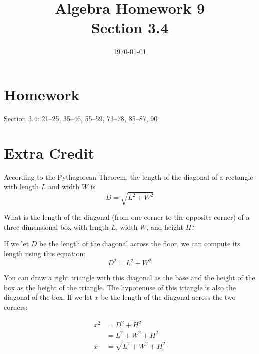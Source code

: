 \documentclass[letterpaper, landscape]{exam}
\title{Algebra Homework 9 \\ Section 3.4 }
\author{}
\date{\today}
\begin{document}
  \maketitle

  \section{Homework}

  Section 3.4: 21--25, 35--46, 55--59, 73--78, 85--87, 90 






  \section{Extra Credit}
  According to the Pythagorean Theorem, the length of the diagonal of a rectangle
  with length $L$ and width $W$ is 
  \[
    D = \sqrt{L^2 + W^2}
  \]  
  
  What is the length of the diagonal (from one corner to the opposite corner) of a three-dimensional
  box with length $L$, width $W$, and height $H$?

  \begin{solution}
    If we let $D$ be the length of the diagonal across the floor, we can compute its length using
    this equation: 
    \[
      D^2 = L^2 + W^2
    \]

    You can draw a right triangle with this diagonal as the base and the height of the box as the
    height of the triangle.  The hypotenuse of this triangle is also the diagonal of the box.  If we
    let $x$ be the length of the diagonal across the two corners:

    \begin{align*}
      x^2 & = D^2 + H^2 \\
          & = L^2 + W^2 + H^2 \\
      x   & = \sqrt{ L^2 + W^2 + H^2 } \\
    \end{align*}

  \end{solution}
\end{document}
